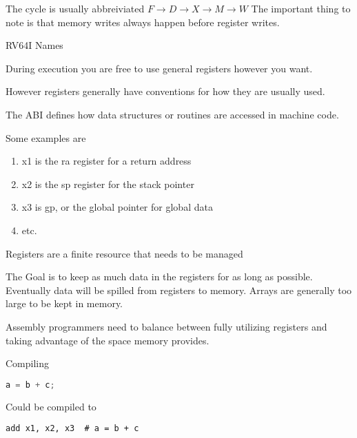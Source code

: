 \documentclass{report}
\begin{document}
\begin{description}
\begin{mdframed}
        The cycle is usually abbreiviated $F \rightarrow D \rightarrow X \rightarrow M \rightarrow W$
        The important thing to note is that memory writes always happen before register writes.
        \end{mdframed}
    \item {\large RV64I Names}
        \begin{mdframed}
            During execution you are free to use general registers however you want.

            However registers generally have conventions for how they are usually used.
            
            The ABI defines how data structures or routines are accessed in machine code.

            \begin{mdframed}
                Some examples are
                \begin{enumerate}
                    \item x1 is the ra register for a return address
                    \item x2 is the sp register for the stack pointer
                    \item x3 is gp, or the global pointer for global data
                    \item etc.
                \end{enumerate}
            \end{mdframed}

            Registers are a finite resource that needs to be managed

            The Goal is to keep as much data in the registers for as long
            as possible. Eventually data will be spilled from registers to
            memory. Arrays are generally too large to be kept in memory.

            Assembly programmers need to balance between fully utilizing
            registers and taking advantage of the space memory provides.
        \end{mdframed}
    \item {\large Compiling}
        \begin{mdframed}
            \begin{lstlisting}[language=C]
                a = b + c;
            \end{lstlisting}

            Could be compiled to

            \begin{lstlisting}[language={[x86asm]Assembler}]
            add x1, x2, x3  # a = b + c
            \end{lstlisting}


\end{mdframed}
\end{description}
\end{document}
